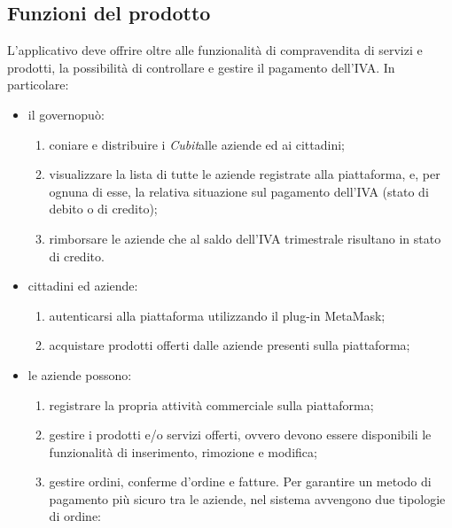 \subsection{Funzioni del prodotto}
L'applicativo deve offrire oltre alle funzionalità di compravendita di servizi e prodotti, la possibilità di controllare e gestire il pagamento dell'IVA. In particolare: 
\begin{itemize}
	\item il governo\glosp può:
	\begin{enumerate}[label=\alph*.]
		\item coniare e distribuire i \textit{Cubit}\glosp alle aziende ed ai cittadini;
		\item visualizzare la lista di tutte le aziende registrate alla piattaforma, e, per ognuna di esse, la relativa situazione sul pagamento dell'IVA (stato di debito o di credito); 
		\item rimborsare le aziende che al saldo dell'IVA trimestrale risultano in stato di credito.
	\end{enumerate}
	\item cittadini ed aziende:
	\begin{enumerate}[label=\alph*.]
		\item autenticarsi alla piattaforma utilizzando il plug-in MetaMask\glo;
		\item acquistare prodotti offerti dalle aziende presenti sulla piattaforma; 
	\end{enumerate}
	\item le aziende possono:
	\begin{enumerate}[label=\alph*.]
		\item registrare la propria attività commerciale sulla piattaforma;
		\item gestire i prodotti e/o servizi offerti, ovvero devono essere disponibili le funzionalità di inserimento, rimozione e modifica;
		\item gestire ordini, conferme d'ordine e fatture. Per garantire un metodo di pagamento più sicuro tra le aziende, nel sistema avvengono due tipologie di ordine:
		

\end{enumerate}
\end{itemize}
